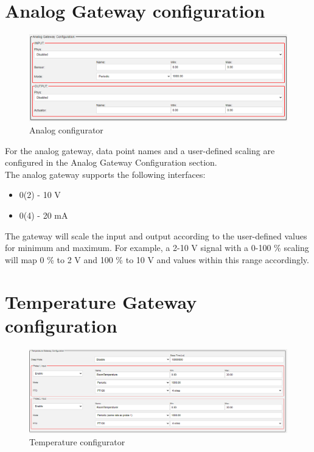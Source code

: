 \documentclass[10pt,letterpaper]{article}
\begin{document}
\newpage
	\section{Analog Gateway configuration}
	\begin{figure}[ht!]
		\includegraphics[width=\textwidth]{Figures/5-analog.png}
		\caption{Analog configurator}
		\label{fig:a-configurator}
	\end{figure}
	For the analog gateway, data point names and a user-defined scaling are configured in the Analog Gateway Configuration section.\\
	The analog gateway supports the following interfaces:
	\begin{itemize}
		\item 0(2) - 10 V
		\item 0(4) - 20 mA
	\end{itemize}

	The gateway will scale the input and output according to the user-defined values for minimum and maximum. For example, a 2-10 V signal with a 0-100 \% scaling will map 0 \% to 2 V and 100 \% to 10 V and values within this range accordingly.


	\section{Temperature Gateway configuration}
	\begin{figure}[ht!]
		\includegraphics[width=\textwidth]{Figures/3-temp.png}
		\caption{Temperature configurator}
		\label{fig:t-configurator}
	\end{figure}
\end{document}
